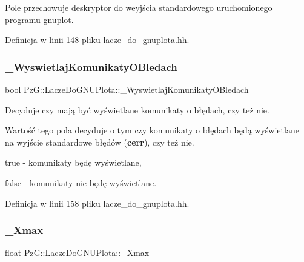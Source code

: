 Pole przechowuje deskryptor do weyjścia standardowego uruchomionego programu gnuplot. 

Definicja w linii 148 pliku lacze\+\_\+do\+\_\+gnuplota.\+hh.

\mbox{\label{class_pz_g_1_1_lacze_do_g_n_u_plota_a2f2800f14ebfe1caef0b4d30c410a7fe}} 
\subsubsection{\texorpdfstring{\+\_\+\+Wyswietlaj\+Komunikaty\+O\+Bledach}{\_WyswietlajKomunikatyOBledach}}
{\footnotesize\ttfamily bool Pz\+G\+::\+Lacze\+Do\+G\+N\+U\+Plota\+::\+\_\+\+Wyswietlaj\+Komunikaty\+O\+Bledach\hspace{0.3cm}{\ttfamily [protected]}}



Decyduje czy mają być wyświetlane komunikaty o błędach, czy też nie. 

Wartość tego pola decyduje o tym czy komunikaty o błędach będą wyświetlane na wyjście standardowe błędów ({\bfseries cerr}), czy też nie. \begin{DoxyItemize}
\item {\ttfamily true} -\/ komunikaty będę wyświetlane, \item {\ttfamily false} -\/ komunikaty nie będę wyświetlane. \end{DoxyItemize}


Definicja w linii 158 pliku lacze\+\_\+do\+\_\+gnuplota.\+hh.

\mbox{\label{class_pz_g_1_1_lacze_do_g_n_u_plota_a847e00678a413ab076ccbcb7eba3ae58}} 
\subsubsection{\texorpdfstring{\+\_\+\+Xmax}{\_Xmax}}
{\footnotesize\ttfamily float Pz\+G\+::\+Lacze\+Do\+G\+N\+U\+Plota\+::\+\_\+\+Xmax\hspace{0.3cm}{\ttfamily [protected]}}



